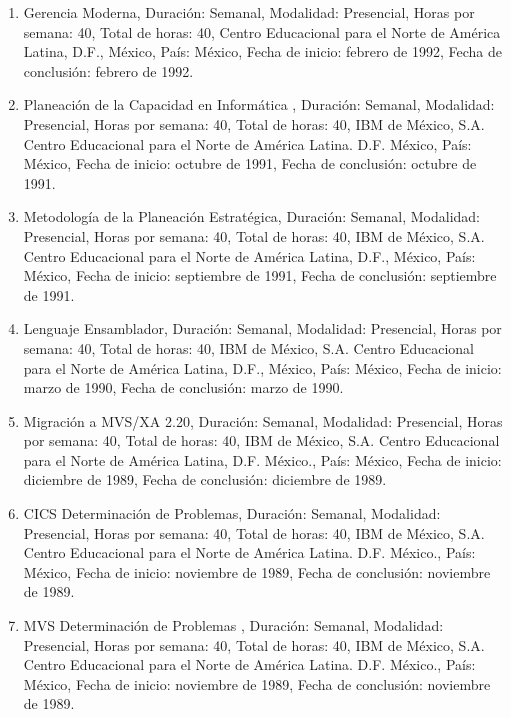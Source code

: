 \documentclass[12pt]{article}
\begin{document}
\begin{enumerate}
\item Gerencia Moderna, Duración: Semanal, Modalidad: Presencial, Horas por semana: 40, Total de horas: 40, Centro Educacional para el 
Norte de América Latina, D.F., México, País: México, Fecha de inicio: febrero de 1992, Fecha de conclusión: febrero de 1992.

\item Planeación de la Capacidad en Informática , Duración: Semanal, Modalidad: Presencial, Horas por semana: 40, Total de horas: 40, 
IBM 
de México, S.A. Centro Educacional para el Norte de América Latina. D.F. México, País: México, Fecha de inicio: octubre de 1991, Fecha 
de conclusión: octubre de 1991.

\item Metodología de la Planeación Estratégica, Duración: Semanal, Modalidad: Presencial, Horas por semana: 40, Total de horas: 40, IBM 
de México, S.A. Centro Educacional para el Norte de América Latina, D.F., México, País: México, Fecha de inicio: septiembre de 1991, 
Fecha de conclusión: septiembre de 1991.

\item Lenguaje Ensamblador, Duración: Semanal, Modalidad: Presencial, Horas por semana: 40, Total de horas: 40, IBM de México, S.A. 
Centro Educacional para el Norte de América Latina, D.F., México, País: México, Fecha de inicio: marzo de 1990, Fecha de conclusión: 
marzo de 1990.

\item Migración a MVS/XA 2.20, Duración: Semanal, Modalidad: Presencial, Horas por semana: 40, Total de horas: 40, IBM de México, S.A. 
Centro Educacional para el Norte de América Latina, D.F. México., País: México, Fecha de inicio: diciembre de 1989, Fecha de 
conclusión: diciembre de 1989.

\item CICS Determinación de Problemas, Duración: Semanal, Modalidad: Presencial, Horas por semana: 40, Total de horas: 40, IBM de 
México, 
S.A. Centro Educacional para el Norte de América Latina. D.F. México., País: México, Fecha de inicio: noviembre de 1989, Fecha de 
conclusión: noviembre de 1989.

\item MVS Determinación de Problemas , Duración: Semanal, Modalidad: Presencial, Horas por semana: 40, Total de horas: 40, IBM de 
México, 
S.A. Centro Educacional para el Norte de América Latina. D.F. México., País: México, Fecha de inicio: noviembre de 1989, Fecha de 
conclusión: noviembre de 1989.


\end{enumerate}
\end{document}
